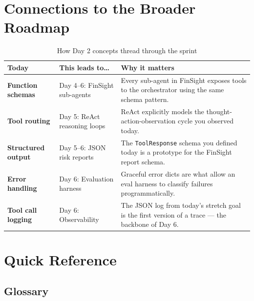 \documentclass[12pt, a4paper]{article}
\begin{document}
\vspace{1.5em}

\section{Connections to the Broader Roadmap}

\begin{table}[h!]
\centering
\small
\begin{tabular}{>{\bfseries}p{2.5cm} p{4.5cm} p{5cm}}
\toprule
\textbf{Today} & \textbf{This leads to\ldots} & \textbf{Why it matters} \\
\midrule
Function schemas & Day 4--6: FinSight sub-agents & Every sub-agent in FinSight exposes tools to the orchestrator using the same schema pattern. \\
\addlinespace
Tool routing & Day 5: ReAct reasoning loops & ReAct explicitly models the thought-action-observation cycle you observed today. \\
\addlinespace
Structured output & Day 5--6: JSON risk reports & The \texttt{ToolResponse} schema you defined today is a prototype for the FinSight report schema. \\
\addlinespace
Error handling & Day 6: Evaluation harness & Graceful error dicts are what allow an eval harness to classify failures programmatically. \\
\addlinespace
Tool call logging & Day 6: Observability & The JSON log from today's stretch goal is the first version of a trace --- the backbone of Day 6. \\
\bottomrule
\end{tabular}
\caption{How Day 2 concepts thread through the sprint}
\end{table}

\section{Quick Reference}

\subsection*{Glossary}
\end{document}
